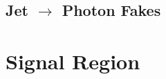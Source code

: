\subsection{Jet $\rightarrow$ Photon Fakes}
\label{sec:FakePho2}

\section{Signal Region}















%
%
%
%
%

%

%










